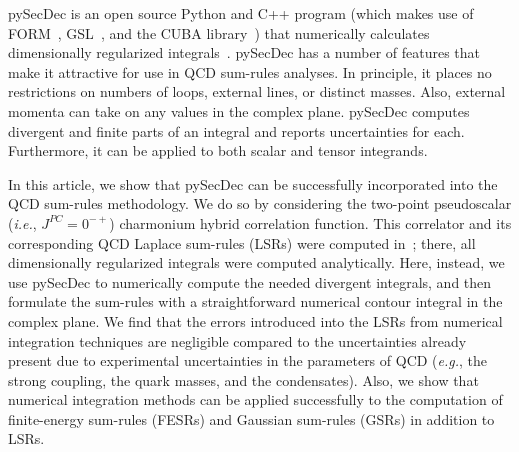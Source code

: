 \documentclass[12pt, letterpaper]{article}
\newcommand{\ie}{\textit{i.e.}}
\newcommand{\eg}{\textit{e.g.}}
\newcommand{\add}[1]{#1}
\begin{document}
pySecDec is an open source Python and C++ program 
(which makes use of FORM~\cite{Vermaseren:2000nd,Kuipers:2013pba,Ruijl:2017dtg}, 
GSL~\cite{galassi2009}, 
and the CUBA library~\cite{Hahn:2004fe,Hahn:2014fua})
that numerically calculates dimensionally regularized integrals~\cite{Borowka:2017idc}.
pySecDec has a number of features that make it attractive for use
in QCD sum-rules analyses.
In principle, it places no restrictions on numbers of loops, external lines, or distinct masses.
Also, external momenta can take on any values in the complex plane.
pySecDec computes divergent and finite parts of an integral 
and reports uncertainties for each.
Furthermore, it can be applied to both scalar and tensor integrands.

In this article, we show that pySecDec can be successfully incorporated into 
the QCD sum-rules methodology.
We do so by considering the two-point pseudoscalar (\ie, $J^{PC}=0^{-+}$) charmonium 
hybrid correlation function. 
This correlator and its corresponding QCD Laplace sum-rules (LSRs) were computed 
in~\cite{Govaerts:1985fx,Berg:2012gd};
there, all dimensionally regularized integrals were computed analytically.
Here, instead, we use pySecDec to numerically compute the needed divergent integrals,
and then formulate the sum-rules with a straightforward numerical contour integral in the 
complex plane.
We find that the errors introduced into the LSRs from numerical integration techniques are negligible
compared to the uncertainties already present due to experimental uncertainties in the 
parameters of QCD (\eg, the strong coupling, the quark masses, and the condensates).
\add{Also, we show that numerical integration 
methods can be applied successfully to the computation of
finite-energy sum-rules (FESRs) and Gaussian sum-rules (GSRs) in addition to LSRs.}
%
%
\end{document}
